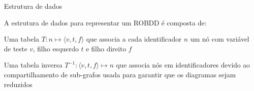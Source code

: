 \expandafter\documentclass\expandafter[table, usenames, svgnames, dvipsnames,14pt, \classopts]{beamer}
\begin{document}
\begin{frame}{Estrutura de dados}

    A estrutura de dados para representar um ROBDD é composta de:

    \begin{outline}
        \1 Uma tabela $T: n \mapsto \langle v,t,f \rangle$
            \2[-] que associa a cada identificador $n$ um nó com variável de teste $v$, filho esquerdo $t$ e filho direito $f$
        
        \vspace{1em}
        
        \1 Uma tabela inversa $T^{-1}: \langle v,t,f \rangle \mapsto n$
            \2[-] que associa nós em identificadores
            \2[-] devido ao compartilhamento de sub-grafos
            \2[-] usada para garantir que os diagramas sejam reduzidos
    \end{outline}

\end{frame}
\end{document}
